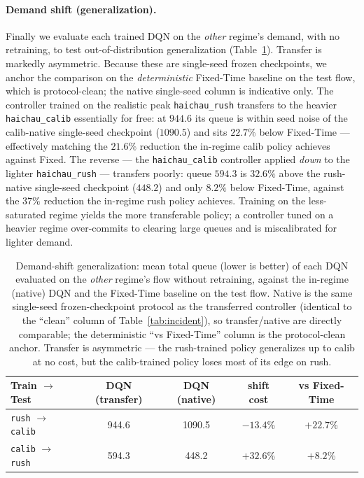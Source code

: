 \paragraph{Demand shift (generalization).} Finally we evaluate each trained DQN on the
\emph{other} regime's demand, with no retraining, to test out-of-distribution generalization
(Table~\ref{tab:shift}). Transfer is markedly asymmetric. Because these are single-seed frozen
checkpoints, we anchor the comparison on the \emph{deterministic} Fixed-Time baseline on the test
flow, which is protocol-clean; the native single-seed column is indicative only. The controller
trained on the realistic peak \texttt{haichau\_rush} transfers to the heavier \texttt{haichau\_calib}
essentially for free: at $944.6$ its queue is within seed noise of the calib-native single-seed
checkpoint ($1090.5$) and sits $22.7\%$ below Fixed-Time --- effectively matching the $21.6\%$
reduction the in-regime calib policy achieves against Fixed. The reverse --- the
\texttt{haichau\_calib} controller applied \emph{down} to the lighter \texttt{haichau\_rush} ---
transfers poorly: queue $594.3$ is $32.6\%$ above the rush-native single-seed checkpoint ($448.2$)
and only $8.2\%$ below Fixed-Time, against the $37\%$ reduction the in-regime rush policy achieves.
Training on the less-saturated regime yields the more transferable policy; a controller tuned on a
heavier regime over-commits to clearing large queues and is miscalibrated for lighter demand.

\begin{table}[H]
\centering
\caption{Demand-shift generalization: mean total queue (lower is better) of each DQN evaluated on
the \emph{other} regime's flow without retraining, against the in-regime (native) DQN and the
Fixed-Time baseline on the test flow. Native is the same single-seed frozen-checkpoint protocol as
the transferred controller (identical to the ``clean'' column of Table~\ref{tab:incident}), so
transfer/native are directly comparable; the deterministic ``vs Fixed-Time'' column is the
protocol-clean anchor. Transfer is asymmetric --- the rush-trained policy generalizes up to calib
at no cost, but the calib-trained policy loses most of its edge on rush.}
\label{tab:shift}
\begin{tabular}{@{}lcccc@{}}
\toprule
\textbf{Train $\rightarrow$ Test} & \textbf{DQN (transfer)} & \textbf{DQN (native)} & \textbf{shift cost} & \textbf{vs Fixed-Time} \\
\midrule
\texttt{rush} $\rightarrow$ \texttt{calib} & 944.6 & 1090.5 & $-13.4$\% & $+22.7$\% \\
\texttt{calib} $\rightarrow$ \texttt{rush} & 594.3 & 448.2 & $+32.6$\% & $+8.2$\% \\
\bottomrule
\end{tabular}
\end{table}

